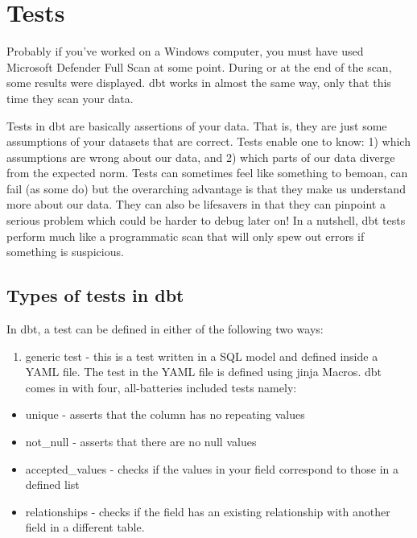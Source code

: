 \documentclass[
]{book}
\providecommand{\tightlist}{%
  \setlength{\itemsep}{0pt}\setlength{\parskip}{0pt}}
\begin{document}
\hypertarget{tests-1}{%
\chapter{Tests}\label{tests-1}}

Probably if you've worked on a Windows computer, you must have used Microsoft Defender Full Scan at some point. During or at the end of the scan, some results were displayed. dbt works in almost the same way, only that this time they scan your data.

Tests in dbt are basically assertions of your data. That is, they are just some assumptions of your datasets that are correct. Tests enable one to know: 1) which assumptions are wrong about our data, and 2) which parts of our data diverge from the expected norm. Tests can sometimes feel like something to bemoan, can fail (as some do) but the overarching advantage is that they make us understand more about our data. They can also be lifesavers in that they can pinpoint a serious problem which could be harder to debug later on! In a nutshell, dbt tests perform much like a programmatic scan that will only spew out errors if something is suspicious.

\hypertarget{types-of-tests-in-dbt}{%
\section{Types of tests in dbt}\label{types-of-tests-in-dbt}}

In dbt, a test can be defined in either of the following two ways:

\begin{enumerate}
\def\labelenumi{\arabic{enumi}.}
\tightlist
\item
  generic test - this is a test written in a SQL model and defined inside a YAML file. The test in the YAML file is defined using jinja Macros. dbt comes in with four, all-batteries included tests namely:
\end{enumerate}

\begin{itemize}
\item
  unique - asserts that the column has no repeating values
\item
  not\_null - asserts that there are no null values
\item
  accepted\_values - checks if the values in your field correspond to those in a defined list
\item
  relationships - checks if the field has an existing relationship with another field in a different table.
\end{itemize}
\end{document}
